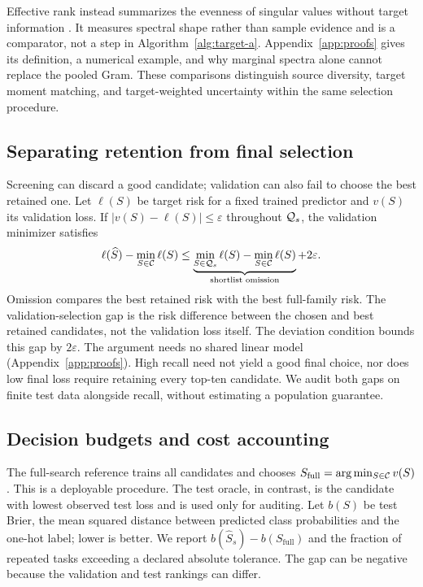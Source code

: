 Effective rank instead summarizes the evenness of singular values without target information \citep{roy2007}. It measures spectral shape rather than sample evidence and is a comparator, not a step in Algorithm~\ref{alg:target-a}. Appendix~\ref{app:proofs} gives its definition, a numerical example, and why marginal spectra alone cannot replace the pooled Gram. These comparisons distinguish source diversity, target moment matching, and target-weighted uncertainty within the same selection procedure.

\subsection{Separating retention from final selection}
Screening can discard a good candidate; validation can also fail to choose the best retained one. Let $\ell(S)$ be target risk for a fixed trained predictor and $v(S)$ its validation loss. If $|v(S)-\ell(S)|\leq\varepsilon$ throughout $\mathcal{Q}_s$, the validation minimizer satisfies
\begin{equation}
 \ell(\widehat S)-\min_{S\in\mathcal{C}}\ell(S)
 \leq
 \underbrace{\min_{S\in\mathcal{Q}_s}\ell(S)-\min_{S\in\mathcal{C}}\ell(S)}_{\text{shortlist omission}}
 +2\varepsilon.
 \label{eq:decomposition}
\end{equation}
Omission compares the best retained risk with the best full-family risk. The validation-selection gap is the risk difference between the chosen and best retained candidates, not the validation loss itself. The deviation condition bounds this gap by $2\varepsilon$. The argument needs no shared linear model (Appendix~\ref{app:proofs}). High recall need not yield a good final choice, nor does low final loss require retaining every top-ten candidate. We audit both gaps on finite test data alongside recall, without estimating a population guarantee.

\subsection{Decision budgets and cost accounting}
The full-search reference trains all candidates and chooses $S_{\mathrm{full}}=\arg\min_{S\in\mathcal{C}}v(S)$. This is a deployable procedure. The test oracle, in contrast, is the candidate with lowest observed test loss and is used only for auditing. Let $b(S)$ be test Brier, the mean squared distance between predicted class probabilities and the one-hot label; lower is better. We report $b(\widehat S_s)-b(S_{\mathrm{full}})$ and the fraction of repeated tasks exceeding a declared absolute tolerance. The gap can be negative because the validation and test rankings can differ.

